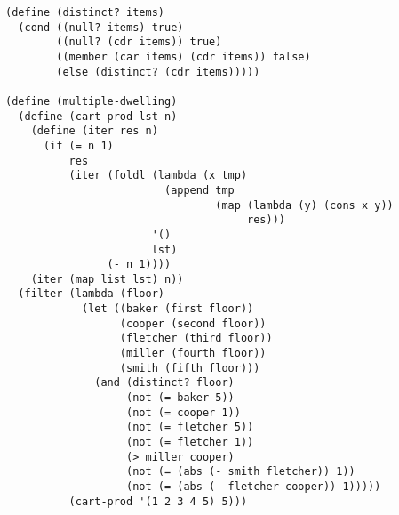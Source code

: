 \documentclass[a4paper,12pt]{article}
\begin{document}
\begin{lstlisting}
(define (distinct? items)
  (cond ((null? items) true)
        ((null? (cdr items)) true)
        ((member (car items) (cdr items)) false)
        (else (distinct? (cdr items)))))

(define (multiple-dwelling)
  (define (cart-prod lst n)
    (define (iter res n)
      (if (= n 1)
          res
          (iter (foldl (lambda (x tmp)
                         (append tmp
                                 (map (lambda (y) (cons x y))
                                      res)))
                       '()
                       lst)
                (- n 1))))
    (iter (map list lst) n))
  (filter (lambda (floor)
            (let ((baker (first floor))
                  (cooper (second floor))
                  (fletcher (third floor))
                  (miller (fourth floor))
                  (smith (fifth floor)))
              (and (distinct? floor)
                   (not (= baker 5))
                   (not (= cooper 1))
                   (not (= fletcher 5))
                   (not (= fletcher 1))
                   (> miller cooper)
                   (not (= (abs (- smith fletcher)) 1))
                   (not (= (abs (- fletcher cooper)) 1)))))
          (cart-prod '(1 2 3 4 5) 5)))
\end{lstlisting}
\end{document}
